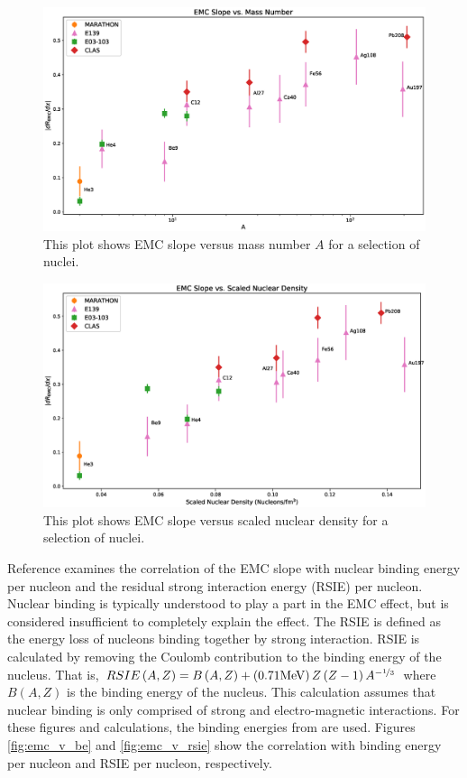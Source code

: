 \begin{figure}[p]
	\includegraphics[width=\textwidth]{./results/fig/EMC_vs_A.eps}
	\caption{This plot shows EMC slope versus mass number $A$ for a selection of nuclei.}
	\label{fig:emc_v_A}
\end{figure}

\begin{figure}[p]
	\includegraphics[width=\textwidth]{./results/fig/EMC_vs_SND.eps}
	\caption{This plot shows EMC slope versus scaled nuclear density for a selection of nuclei.}
	\label{fig:emc_v_snd}
\end{figure}

Reference \cite{slope_predict} examines the correlation of the EMC slope with nuclear binding energy per nucleon and the residual strong interaction energy (RSIE) per nucleon. Nuclear binding is typically understood to play a part in the EMC effect, but is considered insufficient to completely explain the effect. The RSIE is defined as the energy loss of nucleons binding together by strong interaction. RSIE is calculated by removing the Coulomb contribution to the binding energy of the nucleus. That is, $RSIE\left(A,Z\right) = B\left(A,Z\right) + \left(0.71 \text{MeV}\right)Z\left(Z-1\right)A^{-\nicefrac{1}{3}}$ where $B\left(A,Z\right)$ is the binding energy of the nucleus. This calculation assumes that nuclear binding is only comprised of strong and electro-magnetic interactions. For these figures and calculations, the binding energies from \cite{BindingEnergy} are used. Figures \ref{fig:emc_v_be} and \ref{fig:emc_v_rsie} show the correlation with binding energy per nucleon and RSIE per nucleon, respectively.

